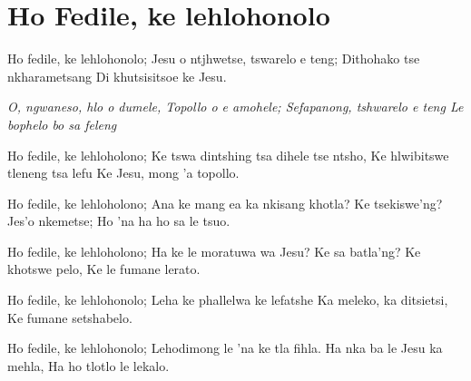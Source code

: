 \starttocol
\chapter{Ho Fedile, ke lehlohonolo}
\nexttocol
\hfill{\it }
\stoptocol
\starttocol
\startlines
{\sc Ho fedile}, ke lehlohonolo; 
Jesu o ntjhwetse, tswarelo e teng;
Dithohako tse nkharametsang
Di khutsisitsoe ke Jesu.

{\it O, ngwaneso, hlo o dumele, 
Topollo o e amohele; 
Sefapanong, tshwarelo e teng
Le bophelo bo sa feleng}

Ho fedile, ke lehloholono;
Ke tswa dintshing tsa dihele tse ntsho,
Ke hlwibitswe tleneng tsa lefu
Ke Jesu, mong 'a topollo.

Ho fedile, ke lehloholono;
Ana ke mang ea ka nkisang khotla?
Ke tsekiswe'ng? Jes'o nkemetse;
Ho 'na ha ho sa le tsuo.

Ho fedile, ke lehloholono;
Ha ke le moratuwa wa Jesu?
Ke sa batla'ng? Ke khotswe pelo,
Ke le fumane lerato.

Ho fedile, ke lehlohonolo;
Leha ke phallelwa ke lefatshe
Ka meleko, ka ditsietsi,
Ke fumane setshabelo.

Ho fedile, ke lehlohonolo;
Lehodimong le 'na ke tla fihla.
Ha nka ba le Jesu ka mehla,
Ha ho tlotlo le lekalo.
\stoplines
\nexttocol

\stoptocol
